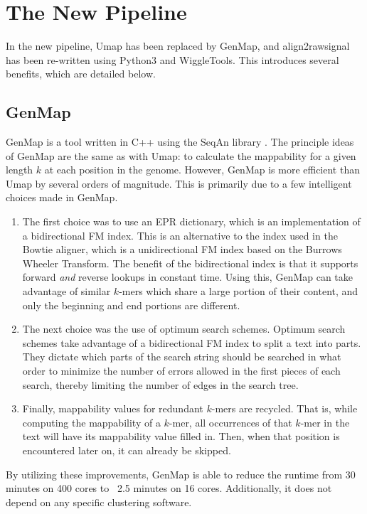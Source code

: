 \documentclass[a4paper]{article}
\begin{document}
  \section{The New Pipeline}
  In the new pipeline, Umap has been replaced by GenMap, and align2rawsignal has been re-written using Python3 and WiggleTools.
  This introduces several benefits, which are detailed below.

    \subsection{GenMap}
    GenMap is a tool written in C++ using the SeqAn library \cite{pockrandt_genmap:_2019}. The principle ideas of GenMap are the same as with Umap:
    to calculate the mappability for a given length $k$ at each position in the genome. However, GenMap is more efficient than
    Umap by several orders of magnitude. This is primarily due to a few intelligent choices made in GenMap.
    \begin{enumerate}
      \item The first choice was to use an EPR dictionary, which is an implementation of a bidirectional FM index.
            This is an alternative to the index used in the Bowtie aligner, which is a unidirectional FM index based on
            the Burrows Wheeler Transform. The benefit of the bidirectional index is that it supports forward \textit{and}
            reverse lookups in constant time. Using this, GenMap can take advantage of similar $k$-mers which share a large
            portion of their content, and only the beginning and end portions are different.
      \item The next choice was the use of optimum search schemes. Optimum search schemes take advantage of a bidirectional
            FM index to split a text into parts. They dictate which parts of the search string should be searched in what order
            to minimize the number of errors allowed in the first pieces of each search, thereby limiting the number of edges
            in the search tree.
      \item Finally, mappability values for redundant $k$-mers are recycled. That is, while computing the mappability of
            a $k$-mer, all occurrences of that $k$-mer in the text will have its mappability value filled in. Then, when
            that position is encountered later on, it can already be skipped.
    \end{enumerate}
    By utilizing these improvements, GenMap is able to reduce the runtime from 30 minutes on 400 cores to ~2.5 minutes on
    16 cores. Additionally, it does not depend on any specific clustering software.
\end{document}

